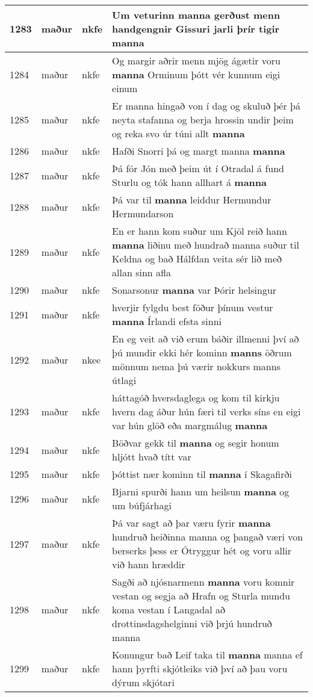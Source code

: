 \documentclass{article}
\begin{document}
\begin{longtable}{p{1cm}|p{1cm}|p{1cm}|p{13cm}}
1283&maður&nkfe&Um veturinn \textbf{manna} gerðust menn handgengnir Gissuri jarli þrír tigir manna\\
\hline
1284&maður&nkfe&Og margir aðrir menn mjög ágætir voru \textbf{manna} Orminum þótt vér kunnum eigi einum\\
\hline
1285&maður&nkfe&Er manna hingað von í dag og skuluð þér þá neyta stafanna og berja hrossin undir þeim og reka svo úr túni allt \textbf{manna} \\
\hline
1286&maður&nkfe&Hafði Snorri þá og margt manna \textbf{manna} \\
\hline
1287&maður&nkfe&Þá fór Jón með þeim út í Otradal á fund Sturlu og tók hann allhart á \textbf{manna} \\
\hline
1288&maður&nkfe&Þá var til \textbf{manna} leiddur Hermundur Hermundarson\\
\hline
1289&maður&nkfe&En er hann kom suður um Kjöl reið hann \textbf{manna} liðinu með hundrað manna suður til Keldna og bað Hálfdan veita sér lið með allan sinn afla\\
\hline
1290&maður&nkfe&Sonarsonur \textbf{manna} var Þórir helsingur\\
\hline
1291&maður&nkfe&hverjir fylgdu best föður þínum vestur \textbf{manna} Írlandi efsta sinni\\
\hline
1292&maður&nkee&En eg veit að við erum báðir illmenni því að þú mundir ekki hér kominn \textbf{manns} öðrum mönnum nema þú værir nokkurs manns útlagi\\
\hline
1293&maður&nkfe&háttagóð hversdaglega og kom til kirkju hvern dag áður hún færi til verks síns en eigi var hún glöð eða margmálug \textbf{manna} \\
\hline
1294&maður&nkfe&Böðvar gekk til \textbf{manna} og segir honum hljótt hvað títt var\\
\hline
1295&maður&nkfe&þóttist nær kominn til \textbf{manna} í Skagafirði\\
\hline
1296&maður&nkfe&Bjarni spurði hann um heilsun \textbf{manna} og um búfjárhagi\\
\hline
1297&maður&nkfe&Þá var sagt að þar væru fyrir \textbf{manna} hundruð heiðinna manna og þangað væri von berserks þess er Ótryggur hét og voru allir við hann hræddir\\
\hline
1298&maður&nkfe&Sagði að njósnarmenn \textbf{manna} voru komnir vestan og segja að Hrafn og Sturla mundu koma vestan í Langadal að drottinsdagshelginni við þrjú hundruð manna\\
\hline
1299&maður&nkfe&Konungur bað Leif taka til \textbf{manna} manna ef hann þyrfti skjótleiks við því að þau voru dýrum skjótari\\

\end{longtable}
\end{document}
